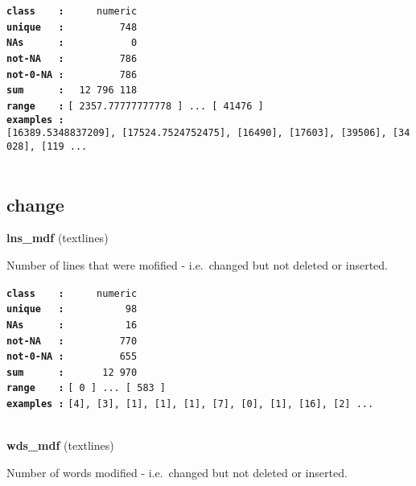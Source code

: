 \documentclass[]{article}
\begin{document}
\textbf{\texttt{class\ \ \ \ :}} \texttt{~~~~~numeric}\\
\textbf{\texttt{unique\ \ \ :}} \texttt{~~~~~~~~~748}\\
\textbf{\texttt{NAs\ \ \ \ \ \ :}} \texttt{~~~~~~~~~~~0}\\
\textbf{\texttt{not-NA\ \ \ :}} \texttt{~~~~~~~~~786}\\
\textbf{\texttt{not-0-NA\ :}} \texttt{~~~~~~~~~786}\\
\textbf{\texttt{sum\ \ \ \ \ \ :}} \texttt{~~12~796~118}\\
\textbf{\texttt{range\ \ \ \ :}}
\texttt{{[}\ 2357.77777777778\ {]}\ ...\ {[}\ 41476\ {]}}\\
\textbf{\texttt{examples\ :}}
\texttt{{[}16389.5348837209{]},\ {[}17524.7524752475{]},\ {[}16490{]},\ {[}17603{]},\ {[}39506{]},\ {[}34028{]},\ {[}119\ ...}\\

~

\subsection{change}\label{change}

\textbf{lns\_mdf} (textlines)

Number of lines that were mofified - i.e.~changed but not deleted or
inserted.

\textbf{\texttt{class\ \ \ \ :}} \texttt{~~~~~numeric}\\
\textbf{\texttt{unique\ \ \ :}} \texttt{~~~~~~~~~~98}\\
\textbf{\texttt{NAs\ \ \ \ \ \ :}} \texttt{~~~~~~~~~~16}\\
\textbf{\texttt{not-NA\ \ \ :}} \texttt{~~~~~~~~~770}\\
\textbf{\texttt{not-0-NA\ :}} \texttt{~~~~~~~~~655}\\
\textbf{\texttt{sum\ \ \ \ \ \ :}} \texttt{~~~~~~12~970}\\
\textbf{\texttt{range\ \ \ \ :}}
\texttt{{[}\ 0\ {]}\ ...\ {[}\ 583\ {]}}\\
\textbf{\texttt{examples\ :}}
\texttt{{[}4{]},\ {[}3{]},\ {[}1{]},\ {[}1{]},\ {[}1{]},\ {[}7{]},\ {[}0{]},\ {[}1{]},\ {[}16{]},\ {[}2{]}\ ...}\\

~

\textbf{wds\_mdf} (textlines)

Number of words modified - i.e.~changed but not deleted or inserted.
\end{document}
